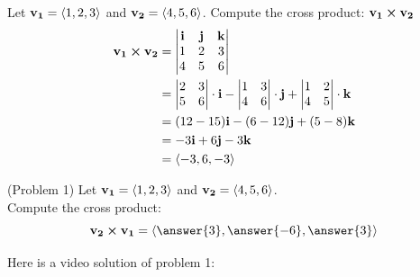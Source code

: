 \documentclass[handout]{ximera}
\begin{document}
\begin{example}[Example 1]
Let $\mathbf{v_1} = \left\langle 1,2,3\right\rangle$ and $\mathbf{v_2} = \left\langle 4, 5, 6\right\rangle$.  
Compute the cross product: $\mathbf{v_1} \boldsymbol\times \mathbf{v_2}$\\
\begin{align*}
\mathbf{v_1} \boldsymbol\times \mathbf{v_2} &= \begin{vmatrix}
\mathbf{i} & \mathbf{j} & \mathbf{k}\\
1 & 2 & 3\\
4 & 5 & 6
\end{vmatrix}\\ 
&= \begin{vmatrix}
 2 & 3  \\
 5 & 6 \\
 \end{vmatrix} \cdot \mathbf i
 - \begin{vmatrix}
 1 & 3  \\
 4 & 6 \\
 \end{vmatrix} \cdot \mathbf j
 + \begin{vmatrix}
 1 & 2  \\
 4 & 5 \\
 \end{vmatrix} \cdot \mathbf k\\
 &= (12-15)\mathbf i - (6 - 12) \mathbf j + (5-8) \mathbf k\\
 &= -3\mathbf i + 6 \mathbf j -3 \mathbf k\\
 &= \left\langle -3, 6, -3\right\rangle
 \end{align*}
 \end{example}

\begin{problem}(Problem 1)
Let $\mathbf{v_1} = \left\langle 1,2,3\right\rangle$ and $\mathbf{v_2} = \left\langle 4, 5, 6\right\rangle$.\\  
Compute the cross product: 
\[
\vec{v_2} \cross \vec{v_1} = \vector{\answer{3}, \answer{-6}, \answer{3}}
\]
\end{problem}

Here is a video solution of problem 1:\\
\begin{foldable}
\end{foldable}
\end{document}
